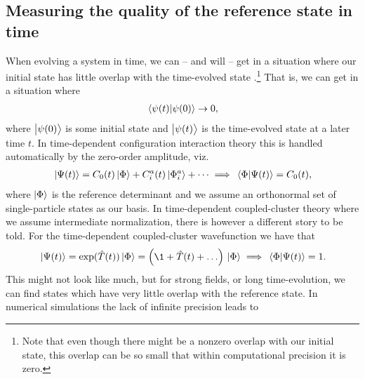         \subsection{Measuring the quality of the reference state in time}
            \label{subsec:cc-phase}
            When evolving a system in time, we can -- and will -- get in a
            situation where our initial state has little overlap with the
            time-evolved state \cite{pedersen2018symplectic}.\footnote{%
                Note that even though there might be a nonzero overlap with our
                initial state, this overlap can be so small that within
                computational precision it is zero.
            }
            That is, we can get in a situation where
            \begin{align}
                \braket*{\psi(t)}{\psi(0)} \to 0,
            \end{align}
            where $\ket{\psi(0)}$ is some initial state and $\ket{\psi(t)}$ is
            the time-evolved state at a later time $t$.
            In time-dependent configuration interaction theory this is handled
            automatically by the zero-order amplitude, viz.
            \begin{gather}
                \ket*{\Psi(t)}
                = C_0(t)\ket*{\Phi}
                + C^{a}_{i}(t)\ket*{\Phi^{a}_{i}}
                + \dots
                \implies
                \braket*{\Phi}{\Psi(t)} = C_0(t),
            \end{gather}
            where $\ket{\Phi}$ is the reference determinant and we assume an
            orthonormal set of single-particle states as our basis.
            In time-dependent coupled-cluster theory where we assume
            intermediate normalization, there is however a different story to be
            told.
            For the time-dependent coupled-cluster wavefunction we have that
            \begin{gather}
                \ket*{\Psi(t)}
                = \exponential(\clust(t))\ket*{\slat}
                = \para{
                    \1
                    + \clust(t)
                    + \dots
                }\ket*{\slat}
                \implies
                \braket*{\slat}{\Psi(t)} = 1.
            \end{gather}
            This might not look like much, but for strong fields, or long
            time-evolution, we can find states which have very little overlap
            with the reference state.
            In numerical simulations the lack of infinite precision leads to
